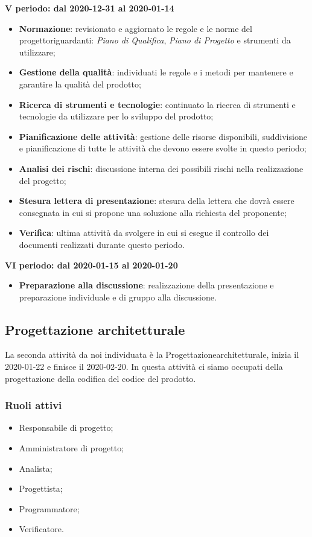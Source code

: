 \textbf{V periodo: dal 2020-12-31 al 2020-01-14}
\begin{itemize}
	\item \textbf{Normazione}: revisionato e aggiornato le regole e le norme del progetto\glosp riguardanti: \textit{Piano di Qualifica}, \textit{Piano di Progetto} e strumenti da utilizzare;
	\item \textbf{Gestione della qualità}: individuati le regole e i metodi per mantenere e garantire la qualità del prodotto\glo;
	\item \textbf{Ricerca di strumenti e tecnologie}: continuato la ricerca di strumenti e tecnologie da utilizzare per lo sviluppo del prodotto\glo;
	\item \textbf{Pianificazione delle attività}: gestione delle risorse disponibili, suddivisione e pianificazione di tutte le attività che devono essere svolte in questo periodo;
	\item \textbf{Analisi dei rischi}: discussione interna dei possibili rischi nella realizzazione del progetto\glo;
	\item \textbf{Stesura lettera di presentazione}: stesura della lettera che dovrà essere consegnata in cui si propone una soluzione alla richiesta del proponente;
	\item \textbf{Verifica}: ultima attività da svolgere in cui si esegue il controllo dei documenti realizzati durante questo periodo.
\end{itemize}

\textbf{VI periodo: dal 2020-01-15 al 2020-01-20}
\begin{itemize}
	\item \textbf{Preparazione alla discussione}: realizzazione della presentazione e preparazione individuale e di gruppo alla discussione.
\end{itemize}

\subsection{Progettazione architetturale}
La seconda attività da noi individuata è la Progettazione\glosp architetturale, inizia il 2020-01-22 e finisce il 2020-02-20. In questa attività ci siamo occupati della progettazione della codifica del codice del prodotto\glo.

\subsubsection{Ruoli attivi}
\begin{itemize}
	\item Responsabile di progetto\glo;
	\item Amministratore di progetto\glo;
	\item Analista;
	\item Progettista;
	\item Programmatore;
	\item Verificatore.
\end{itemize}

